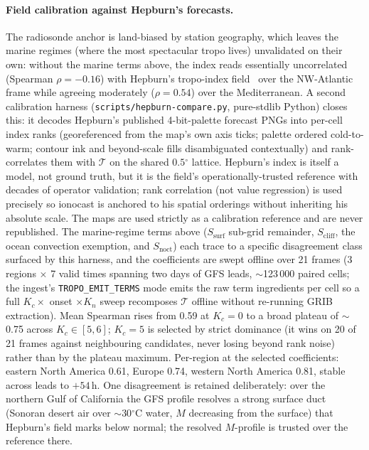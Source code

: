 \documentclass[11pt,a4paper]{article}
\newcommand{\degree}{\ensuremath{{}^\circ}}
\begin{document}
\paragraph{Field calibration against Hepburn's forecasts.}  The
radiosonde anchor is land-biased by station geography, which
leaves the marine regimes (where the most spectacular tropo
lives) unvalidated on their own: without the marine terms above,
the index reads
essentially uncorrelated (Spearman $\rho = -0.16$) with Hepburn's
tropo-index field~\cite{hepburntropo} over the NW-Atlantic frame
while agreeing moderately ($\rho = 0.54$) over the Mediterranean.
A second calibration harness
(\texttt{scripts/hepburn-compare.py}, pure-stdlib Python)
closes this: it decodes Hepburn's published 4-bit-palette
forecast PNGs into per-cell index ranks (georeferenced from the
map's own axis ticks; palette ordered cold-to-warm; contour ink
and beyond-scale fills disambiguated contextually) and
rank-correlates them with $\mathcal{T}$ on the shared
$0.5\degree$ lattice.  Hepburn's index is itself a model, not
ground truth, but it is the field's operationally-trusted
reference with decades of operator validation; rank correlation
(not value regression) is used precisely so ionocast is anchored
to his spatial orderings without inheriting his absolute scale.
The maps are used strictly as a calibration reference and are
never republished.  The marine-regime terms above
($S_{\text{surf}}$ sub-grid remainder, $S_{\text{cliff}}$, the
ocean convection exemption, and $S_{\text{noct}}$) each
trace to a specific disagreement class surfaced by this harness,
and the coefficients are swept offline over 21 frames (3
regions $\times$ 7 valid times spanning two days of GFS leads,
${\sim}$123\,000 paired cells; the ingest's
\texttt{TROPO\_EMIT\_TERMS} mode emits the raw term ingredients
per cell so a full $K_c \times$ onset $\times K_n$ sweep
recomposes $\mathcal{T}$ offline without re-running GRIB
extraction).  Mean Spearman rises from 0.59 at $K_c = 0$ to a
broad plateau of ${\sim}$0.75 across $K_c \in [5, 6]$; $K_c = 5$
is selected by strict dominance (it wins on 20 of
21 frames against neighbouring candidates, never losing beyond
rank noise) rather than by the
plateau maximum.  Per-region at the selected coefficients:
eastern North America 0.61, Europe 0.74, western North America
0.81, stable across leads to $+54$\,h.  One disagreement is
retained deliberately: over the northern Gulf of California the
GFS profile resolves a strong surface duct (Sonoran desert air
over ${\sim}30\degree$C water, $M$ decreasing from the
surface) that Hepburn's field marks below normal; the resolved
$M$-profile is trusted over the reference there.
\end{document}
